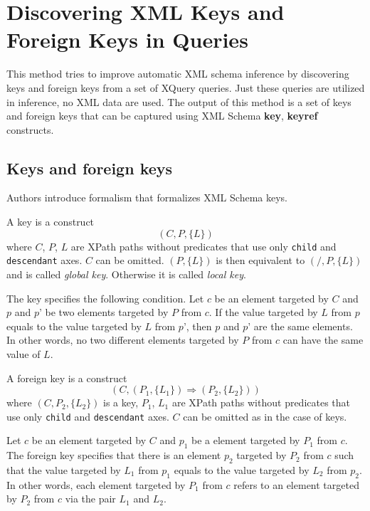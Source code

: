 \section{Discovering XML Keys and Foreign Keys in Queries}
This method tries to improve automatic XML schema inference by discovering keys and foreign keys from a set of XQuery queries. Just these queries are utilized in inference, no XML data are used. The output of this method is a set of keys and foreign keys that can be captured using XML Schema \textbf{key}, \textbf{keyref}  constructs.

\subsection{Keys and foreign keys}
Authors introduce formalism that formalizes XML Schema keys.

\begin{define}[Key]
A key is a construct $$(C, P, \{L\})$$ where $C$, $P$, $L$ are XPath paths without predicates that use only \texttt{child} and \texttt{descendant} axes.
$C$ can be omitted. $(P, \{L\})$ is then equivalent to $(/, P, \{L\})$ and is called \emph{global key}. Otherwise it is called \emph{local key}.
\end{define}

The key specifies the following condition. Let $c$ be an element targeted by $C$ and $p$ and $p’$ be two elements targeted by $P$ from $c$. If the value targeted by $L$ from $p$ equals to the value targeted by $L$ from $p’$, then $p$ and $p’$ are the same elements. In other words, no two different elements targeted by $P$ from $c$ can have the same value of $L$.

\begin{define}
A foreign key is a construct $$(C, (P_1, \{L_1\}) \Rightarrow (P_2, \{L_2\}))$$ where $(C, P_2, \{L_2\})$ is a key, $P_1$, $L_1$ are XPath paths without predicates that use only \texttt{child} and \texttt{descendant} axes.
$C$ can be omitted as in the case of keys.
\end{define}

Let $c$ be an element targeted by $C$ and $p_1$ be a element targeted by $P_1$ from $c$. The foreign key specifies that there is an element $p_2$ targeted by $P_2$ from $c$ such that the value targeted by $L_1$ from $p_1$ equals to the value targeted by $L_2$ from $p_2$. In other words, each element targeted by $P_1$ from $c$ refers to an element targeted by $P_2$ from $c$ via the pair $L_1$ and $L_2$.

